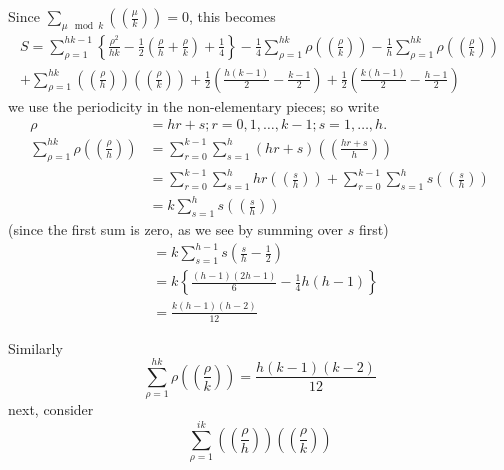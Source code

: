 Since $\sum\limits_{\mu \mod k}\left(
\left(\frac{\mu}{k}\right)\right)=0$, \quad this becomes 
\begin{multline*}
  S = \sum^{hk-1}_{\rho=1} \left\{ \frac{\rho^2}{hk} - \frac{1}{2}
  \left( \frac{\rho}{h} + \frac{\rho}{k}\right)+ \frac{1}{4}\right\}-
  \frac{1}{4} \sum^{hk}_{\rho=1} \rho \left(
  \left(\frac{\rho}{k}\right)\right)- \frac{1}{h} \sum^{hk}_{\rho=1}
  \rho \left( \left(\frac{\rho}{k}\right)\right)\\
  +\sum^{hk}_{\rho=1} \left( \left(\frac{\rho}{h}\right)\right)
  \left( \left(\frac{\rho}{k}\right)\right)+ \frac{1}{2} \left(
  \frac{h(k-1)}{2} - \frac{k-1}{2}\right) + \frac{1}{2} \left(
  \frac{k(h-1)}{2} - \frac{h-1}{2}\right)  
\end{multline*}\pageoriginale
we use the periodicity in the non-elementary pieces; so write
\begin{align*}
  \rho & = hr+s; r=0,1, \ldots, k-1; s=1, \ldots, h.\\
  \sum^{hk}_{\rho=1} \rho \left( \left(\frac{\rho}{h}\right)\right) &
  = \sum^{k-1}_{r=0} \sum^{h}_{s=1} (hr+s)
  \left(\left(\frac{hr+s}{h}\right)\right)\\
  & = \sum^{k-1}_{r=0} \sum^{h}_{s=1} hr \left(
  \left(\frac{s}{h}\right)\right)+ \sum^{k-1}_{r=0}\sum^h_{s=1} s
  \left(\left(\frac{s}{h}\right)\right)    \\
  & = k \sum^h_{s=1} s \left( \left(\frac{s}{h}\right)\right) 
\end{align*}
(since the first sum is zero, as we see by summing over $s$ first)
\begin{align*}
  & = k \sum^{h-1}_{s=1} s\left( \frac{s}{h} - \frac{1}{2}\right)\\
  & = k \left\{\frac{(h-1)(2h-1)}{6} - \frac{1}{4} h (h-1) \right\}\\
  & = \frac{k(h-1)(h-2)}{12}
\end{align*}

Similarly\pageoriginale
$$
\sum^{hk}_{\rho=1}\rho \left( \left(\frac{\rho}{k}\right)\right)=
\frac{h(k-1)(k-2)}{12}  
$$
next, consider 
$$
\sum^{ik}_{\rho=1} \left( \left(\frac{\rho}{h}\right)\right) \left(
\left(\frac{\rho}{k}\right)\right)  
$$

